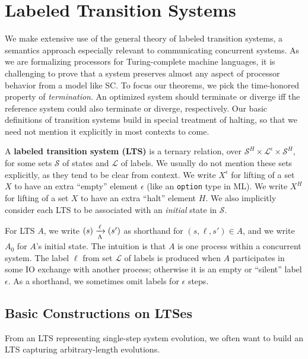 \section{Labeled Transition Systems}\label{sec:lts}

We make extensive use of the general theory of labeled transition
systems, a semantics approach especially relevant to communicating
concurrent systems.  As we are formalizing processors for
Turing-complete machine languages, it is challenging to prove that a
system preserves almost any aspect of processor behavior from a model
like SC.  To focus our theorems, we pick the time-honored property of
\emph{termination}.  An optimized system should terminate or diverge
iff the reference system could also terminate or diverge,
respectively.  Our basic definitions of transition systems build in
special treatment of halting, so that we need not mention it
explicitly in most contexts to come.

\begin{defn}
A \textbf{labeled transition system (LTS)} is a ternary relation, over
$\mathcal S^H \times \mathcal L^\epsilon \times \mathcal S^H$, for some sets
$\mathcal S$ of states and $\mathcal L$ of labels. We usually do not mention
these sets explicitly, as they tend to be clear from context. We write
$X^\epsilon$ for lifting of a set $X$ to have an extra ``empty'' element
$\epsilon$ (like an \texttt{option} type in ML). We write $X^H$ for lifting of
a set $X$ to have an extra ``halt'' element $H$. We also implicitly consider
each LTS to be associated with an \emph{initial} state in $\mathcal S$.
\end{defn}

For LTS $A$, we write $\io{A}{s}{s'}{\ell}$ as shorthand for $(s,
\ell, s') \in A$, and we write $A_0$ for $A$'s initial state. The
intuition is that $A$ is one process within a concurrent system. The
label $\ell$ from set $\mathcal L$ of labels is produced when $A$
participates in some IO exchange with another process; otherwise it is
an empty or ``silent'' label $\epsilon$.  As a shorthand, we sometimes
omit labels for $\epsilon$ steps.

\subsection{Basic Constructions on LTSes}

From an LTS representing single-step system evolution, we often want to build
an LTS capturing arbitrary-length evolutions.

